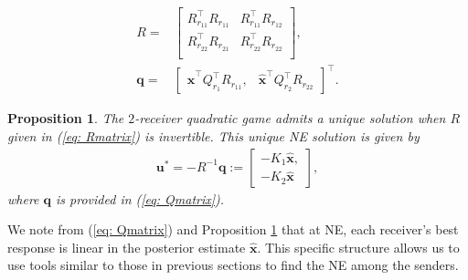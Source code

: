 \documentclass[12pt,journal,onecolumn]{IEEEtran}
\newtheorem{prop}{{Proposition}}
\begin{document}

\begin{align}
    R=&\begin{bmatrix}
        R_{r_11}^\top R_{r_11} & R_{r_11}^\top R_{r_12}\\
        R_{r_22}^\top R_{r_21} & R_{r_22}^\top R_{r_22}\\
    \end{bmatrix},  \label{eq: Rmatrix} \\
    \boldsymbol{q}=&\begin{bmatrix} \boldsymbol{\hat{x}}^\top Q_{r_1}^\top 
    R_{r_11}, & \boldsymbol{\hat{x}}^\top Q_{r_2}^\top R_{r_22} 
\end{bmatrix}^\top.\label{eq: Qmatrix}
\end{align}
\begin{prop}\label{prop: receievrbestresp}
    The $2$-receiver quadratic game admits a unique solution when $R$ given in (\ref{eq: Rmatrix}) is invertible. This unique NE solution is given by
    \begin{align*}
        \boldsymbol{u}^*=-R^{-1}\boldsymbol{q}:=\begin{bmatrix}
            -K_1\boldsymbol{\hat{x}}, \\ -K_2\boldsymbol{\hat{x}}
        \end{bmatrix},
    \end{align*}
where $\boldsymbol{q}$ is provided in (\ref{eq: Qmatrix}).
\end{prop}
We note from (\ref{eq: Qmatrix}) and Proposition \ref{prop: receievrbestresp} that at NE, each receiver's best response is linear in the posterior estimate $\hat{\boldsymbol{x}}$. This specific structure allows us to use tools similar to those in previous sections to find the NE among the senders.
\end{document}
